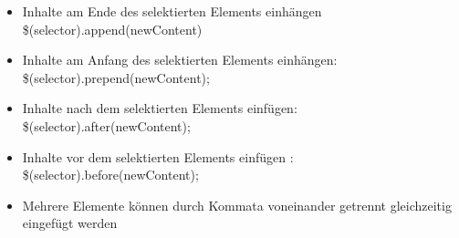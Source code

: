 \documentclass[10pt]{article}
\begin{document}
    \begin{tcolorbox}[
    colback=Red!5!white,
    colframe=Red!75!black,
    title={\centering Elemente einfügen}]
    \begin{itemize}
        \item Inhalte am Ende des selektierten Elements einhängen \\ \$(selector).append(newContent)
        \item Inhalte am Anfang des selektierten Elements einhängen: \\ \$(selector).prepend(newContent);
        \item Inhalte nach dem selektierten Elements einfügen: \\ \$(selector).after(newContent);
        \item Inhalte vor dem selektierten Elements einfügen : \\ \$(selector).before(newContent);
        \item Mehrere Elemente können durch Kommata voneinander getrennt gleichzeitig eingefügt werden
    \end{itemize}
    \end{tcolorbox}
\end{document}
